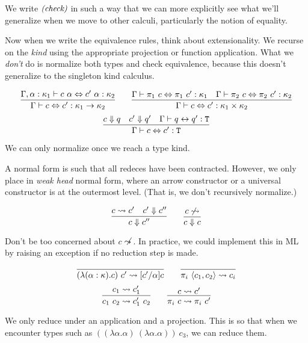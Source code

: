 We write $\emph{(check)}$ in such a way that we can more explicitly see what we'll
generalize when we move to other calculi, particularly the notion of equality.

Now when we write the equivalence rules, think about extensionality. We recurse on the
\emph{kind} using the appropriate projection or function application. What we \emph{don't}
do is normalize both types and check equivalence, because this doesn't generalize to
the singleton kind calculus.

\begin{judgment}
\[ \infer
    {\Gamma \vdash c \Leftrightarrow c' : \kappa_1 \rightarrow \kappa_2}
    {\Gamma, \alpha : \kappa_1 \vdash c~\alpha \Leftrightarrow c'~\alpha : \kappa_2}
  \qquad
  \infer
    {\Gamma \vdash c \Leftrightarrow c' : \kappa_1 \times \kappa_2}
    {\Gamma \vdash \pi_1~c \Leftrightarrow \pi_1~c' : \kappa_1
    &\Gamma \vdash \pi_2~c \Leftrightarrow \pi_2~c' : \kappa_2
    }
\]
\[
  \infer
    {\Gamma \vdash c \Leftrightarrow c' : \T}
    {c \Downarrow q
    &c' \Downarrow q'
    &\Gamma \vdash q \leftrightarrow q' : \T
    }
\]
\end{judgment}
We can only normalize once we reach a type kind.

A normal form is such that all redeces have been contracted. However, we
only place in \emph{weak head} normal form, where an arrow constructor or
a universal constructor is at the outermost level. (That is, we don't recursively
normalize.)

\begin{judgment}
\[
  \infer
    {c \Downarrow c''}
    {c \leadsto c' & c' \Downarrow c''}
  \qquad
  \infer
    {c \Downarrow c}
    {c \not\leadsto}
\]
\end{judgment}
Don't be too concerned about $c \not\leadsto$. In practice, we could implement
this in ML by raising an exception if no reduction step is made.

\begin{judgment}
\[
  \infer{(\lambda(\alpha : \kappa).c)~c' \leadsto [c'/\alpha]c}{}
  \qquad
  \infer{\pi_i~\langle c_1, c_2 \rangle \leadsto c_i}{}
\]
\[
  \infer{c_1~c_2 \leadsto c_1'~c_2}{c_1 \leadsto c_1'}
  \qquad
  \infer{\pi_i~c \leadsto \pi_i~c'}{c \leadsto c'}
\]
\end{judgment}
We only reduce under an application and a projection. This is so that when we
encounter types such as $((\lambda \alpha. \alpha)~(\lambda \alpha.\alpha))~c_3$,
we can reduce them.

